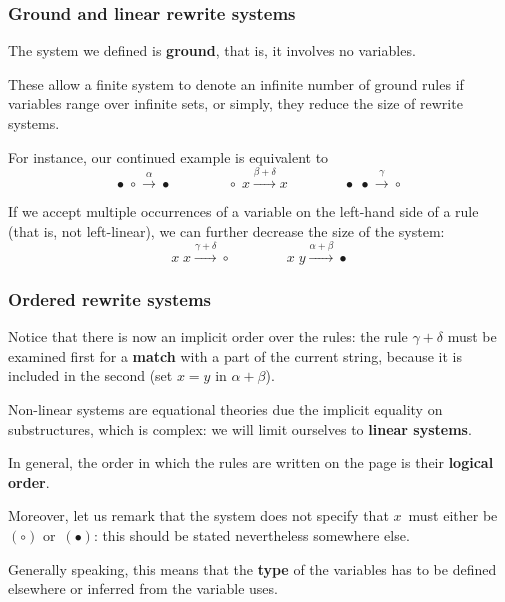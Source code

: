 \documentclass[compress,dvipdfmx]{beamer}
\begin{document}
\begin{frame}
  \frametitle{Ground and linear rewrite systems}

  The system we defined is \textbf{ground}, that is, it involves no
  variables.

  \bigskip

  These allow a finite system to denote an infinite number of ground
  rules if variables range over infinite sets, or simply, they reduce
  the size of rewrite systems.

  \bigskip

  For instance, our continued example is equivalent to
  \begin{equation*}
    \bullet \; \circ \xrightarrow{\alpha} \bullet
    \qquad\qquad
    \circ \; x \xrightarrow{\beta+\delta} x
    \qquad\qquad
    \bullet \; \bullet \xrightarrow{\gamma} \circ
  \end{equation*}

  \medskip

  If we accept multiple occurrences of a variable on the
  left\hyp{}hand side of a rule (that is, not left\hyp{}linear), we
  can further decrease the size of the system:
  \begin{equation*}
    x  \; x \xrightarrow{\gamma+\delta} \circ\qquad\qquad
    x  \; y \xrightarrow{\alpha+\beta} \bullet
  \end{equation*}

\end{frame}


\begin{frame}
  \frametitle{Ordered rewrite systems}

  Notice that there is now an implicit order over the rules: the rule
  \(\gamma+\delta\) must be examined first for a \textbf{match} with a
  part of the current string, because it is included in the second
  (set \(x=y\) in \(\alpha+\beta\)).

  \bigskip

  Non\hyp{}linear systems are equational theories due the implicit
  equality on substructures, which is complex: we will limit ourselves
  to \textbf{linear systems}.

  \bigskip

  In general, the order in which the rules are written on the page is
  their \textbf{logical order}.

  \bigskip

  Moreover, let us remark that the system does not specify that
  \(x\)~must either be~\((\circ)\) or~\((\bullet)\): this should be
  stated nevertheless somewhere else.

  \bigskip

  Generally speaking, this means that the \textbf{type} of the
  variables has to be defined elsewhere or inferred from the variable
  uses.

\end{frame}
\end{document}
